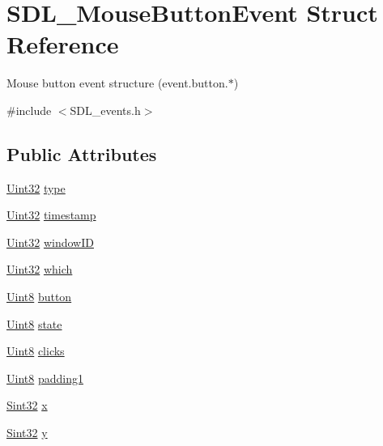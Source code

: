 \hypertarget{struct_s_d_l___mouse_button_event}{}\section{S\+D\+L\+\_\+\+Mouse\+Button\+Event Struct Reference}
\label{struct_s_d_l___mouse_button_event}


Mouse button event structure (event.\+button.$\ast$)  




{\ttfamily \#include $<$S\+D\+L\+\_\+events.\+h$>$}

\subsection*{Public Attributes}
\begin{DoxyCompactItemize}
\item 
\mbox{\hyperlink{_s_d_l__stdinc_8h_add440eff171ea5f55cb00c4a9ab8672d}{Uint32}} \mbox{\hyperlink{struct_s_d_l___mouse_button_event_af64cb09ea68b8081ecc8ee498552e3d7}{type}}
\item 
\mbox{\hyperlink{_s_d_l__stdinc_8h_add440eff171ea5f55cb00c4a9ab8672d}{Uint32}} \mbox{\hyperlink{struct_s_d_l___mouse_button_event_ab05e8a454692608ff56c502e95799c56}{timestamp}}
\item 
\mbox{\hyperlink{_s_d_l__stdinc_8h_add440eff171ea5f55cb00c4a9ab8672d}{Uint32}} \mbox{\hyperlink{struct_s_d_l___mouse_button_event_ab3b855d4b543b5d02fcf5d56e4421393}{window\+ID}}
\item 
\mbox{\hyperlink{_s_d_l__stdinc_8h_add440eff171ea5f55cb00c4a9ab8672d}{Uint32}} \mbox{\hyperlink{struct_s_d_l___mouse_button_event_a366aef59a0f393afc8a3561e741825df}{which}}
\item 
\mbox{\hyperlink{_s_d_l__stdinc_8h_a2944638813a090aa23e62f4da842c3e2}{Uint8}} \mbox{\hyperlink{struct_s_d_l___mouse_button_event_a1a4680e19ae06d02d2093f0bcba1b24c}{button}}
\item 
\mbox{\hyperlink{_s_d_l__stdinc_8h_a2944638813a090aa23e62f4da842c3e2}{Uint8}} \mbox{\hyperlink{struct_s_d_l___mouse_button_event_a8809cef85cfffad4f2059f2ba4fc6a3d}{state}}
\item 
\mbox{\hyperlink{_s_d_l__stdinc_8h_a2944638813a090aa23e62f4da842c3e2}{Uint8}} \mbox{\hyperlink{struct_s_d_l___mouse_button_event_aa606bebcbc3ffc7e932016039c2a36a1}{clicks}}
\item 
\mbox{\hyperlink{_s_d_l__stdinc_8h_a2944638813a090aa23e62f4da842c3e2}{Uint8}} \mbox{\hyperlink{struct_s_d_l___mouse_button_event_a765957d218d16fa00558fa4d20e80689}{padding1}}
\item 
\mbox{\hyperlink{_s_d_l__stdinc_8h_a7a90b941db9d4582e9ad7abb9940ff7e}{Sint32}} \mbox{\hyperlink{struct_s_d_l___mouse_button_event_a5bb9c61b86e999f58637511e32e3a076}{x}}
\item 
\mbox{\hyperlink{_s_d_l__stdinc_8h_a7a90b941db9d4582e9ad7abb9940ff7e}{Sint32}} \mbox{\hyperlink{struct_s_d_l___mouse_button_event_a7ccb5c55a7ddadce723f4ea6d5269540}{y}}
\end{DoxyCompactItemize}


